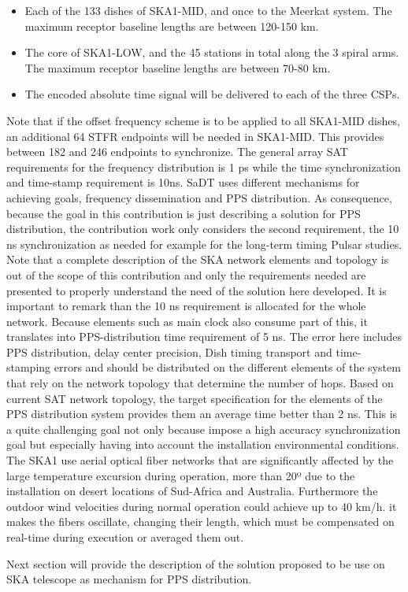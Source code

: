 \begin{itemize}
	\item {Each of the 133 dishes of SKA1-MID, and once to the Meerkat system. The maximum receptor baseline lengths are between 120-150 km.}
	\item {The core of SKA1-LOW, and the 45 stations in total along the 3 spiral arms. The maximum receptor baseline lengths are between 70-80 km. }
	\item {The encoded absolute time signal will be delivered to each of the three CSPs.}
\end{itemize}
 
Note that if the offset frequency scheme is to be applied to all SKA1-MID dishes, an additional 64 STFR endpoints will be needed in SKA1-MID. This provides between 182 and 246 endpoints to synchronize. 
The general array SAT requirements for the frequency distribution is 1 ps while the time synchronization and time-stamp requirement is 10ns. SaDT uses different mechanisms for achieving goals, frequency dissemination and PPS distribution. As consequence, because the goal in this contribution is just describing a solution for PPS distribution, the contribution work only considers the second requirement, the 10 ns synchronization as needed for example for the long-term timing Pulsar studies. Note that a complete description of the SKA network elements and topology is out of the scope of this contribution and only the requirements needed are presented to properly understand the need of the solution here developed. 
It is important to remark than the 10 ns requirement is allocated for the whole 
network. Because elements such as main clock also consume part of this, it 
translates into PPS-distribution time requirement of 5 ns. The error here 
includes PPS distribution, delay center precision, Dish timing transport and 
time-stamping errors and should be distributed on the different elements of the 
system that rely on the network topology that determine the number of hops. 
Based on current SAT network topology, the target specification for the 
elements of the PPS distribution system provides them an average time better 
than 2 ns. This is a quite challenging goal not only because impose a high 
accuracy synchronization goal but especially having into account the 
installation environmental conditions. The SKA1 use aerial optical fiber 
networks that are significantly affected by the large temperature excursion 
during operation, more than 20º due to the installation on desert locations of 
Sud-Africa and Australia. Furthermore the outdoor wind velocities during normal 
operation could achieve up to 40 km/h. it makes the fibers oscillate, changing 
their length, which must be compensated on real-time during execution or 
averaged them out. 

Next section will provide the description of the solution proposed to be use on SKA telescope as mechanism for PPS distribution. 
